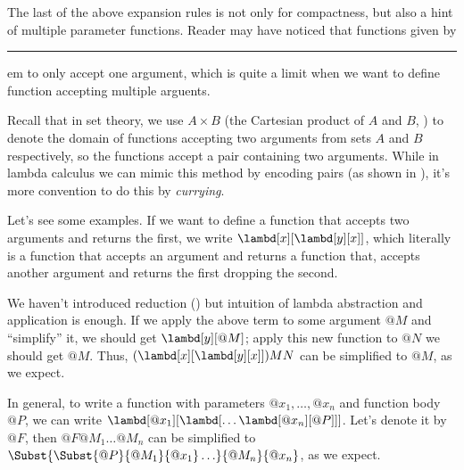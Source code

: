 \documentclass[../../../include/open-logic-section]{subfiles}
\begin{document}

The last of the above expansion rules is not only for compactness, but
also a hint of multiple parameter functions. Reader may have noticed
that functions given by \rule[ABS] seem to only accept one argument, which
is quite a limit when we want to define function accepting multiple
arguents.

Recall that in set theory, we use $A \times B$ (the Cartesian product
of $A$ and $B$, \olref[sfr][set][pai]) to denote the domain of functions accepting two
arguments from sets $A$ and $B$ respectively, so the functions accept
a pair containing two arguments. While in lambda calculus we can mimic
this method by encoding pairs (as shown in \olref[lc][rep][pai]), it's
more convention to do this by \emph{currying}.

Let's see some examples. If we want to define a function that accepts
two arguments and returns the first, we write
$\lambd[x][\lambd[y][x]]$, which literally is a function that accepts
an argument and returns a function that, accepts another argument and
returns the first dropping the second. 

We haven't introduced reduction (\olref[lc][int][bet]) but intuition
of lambda abstraction and application is enough. If we apply the above
term to some argument $@M$ and ``simplify'' it, we should get $\lambd[y][@M]$; apply this new function to $@N$
we should get $@M$. Thus, $(\lambd[x][\lambd[y][x]])MN$ can be
simplified to $@M$, as we expect.

In general, to write a function with parameters $@x_1, \ldots, @x_n$
and function body $@P$, we can write
$\lambd[@x_1][\lambd[\ldots\lambd[@x_n][@P]]]$. Let's denote it by $@F$,
then $@F@M_1\ldots @M_n$ can be simplified to
$\Subst{\Subst{@P}{@M_1}{@x_1}\ldots}{@M_n}{@x_n}$, as we expect.
\end{document}
